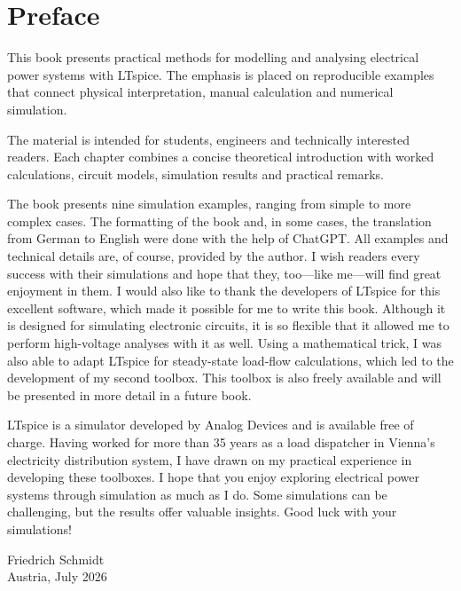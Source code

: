 \chapter*{Preface}
This book presents practical methods for modelling and analysing electrical power systems with LTspice. The emphasis is placed on reproducible examples that connect physical interpretation, manual calculation and numerical simulation.

The material is intended for students, engineers and technically interested readers. Each chapter combines a concise theoretical introduction with worked calculations, circuit models, simulation results and practical remarks.

The book presents nine simulation examples, ranging from simple to more complex cases. The formatting of the book and, in some cases, the translation from German to English were done with the help of ChatGPT. All examples and technical details are, of course, provided by the author. I wish readers every success with their simulations and hope that they, too—like me—will find great enjoyment in them.
I would also like to thank the developers of LTspice for this excellent software, which made it possible for me to write this book. Although it is designed for simulating electronic circuits, it is so flexible that it allowed me to perform high-voltage analyses with it as well. Using a mathematical trick, I was also able to adapt LTspice for steady-state load-flow calculations, which led to the development of my second toolbox. This toolbox is also freely available and will be presented in more detail in a future book.

LTspice is a simulator developed by Analog Devices and is available free of charge. Having worked for more than 35 years as a load dispatcher in Vienna’s electricity distribution system, I have drawn on my practical experience in developing these toolboxes.
I hope that you enjoy exploring electrical power systems through simulation as much as I do. Some simulations can be challenging, but the results offer valuable insights. Good luck with your simulations!

\vspace{2cm}
\begin{flushright}
Friedrich Schmidt\\
Austria, July 2026
\end{flushright}
\newpage